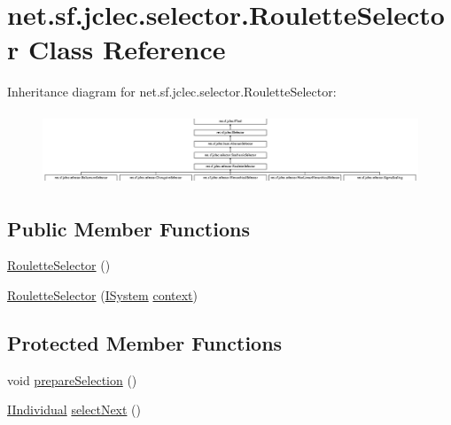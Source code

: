 \hypertarget{classnet_1_1sf_1_1jclec_1_1selector_1_1_roulette_selector}{\section{net.\-sf.\-jclec.\-selector.\-Roulette\-Selector Class Reference}
\label{classnet_1_1sf_1_1jclec_1_1selector_1_1_roulette_selector}
}
Inheritance diagram for net.\-sf.\-jclec.\-selector.\-Roulette\-Selector\-:\begin{figure}[H]
\begin{center}
\leavevmode
\includegraphics[height=2.160772cm]{classnet_1_1sf_1_1jclec_1_1selector_1_1_roulette_selector}
\end{center}
\end{figure}
\subsection*{Public Member Functions}
\begin{DoxyCompactItemize}
\item 
\hyperlink{classnet_1_1sf_1_1jclec_1_1selector_1_1_roulette_selector_afaec52b2dd1d7525b35d5976fd80e426}{Roulette\-Selector} ()
\item 
\hyperlink{classnet_1_1sf_1_1jclec_1_1selector_1_1_roulette_selector_a2daee135bd852331d23930344a51fb0c}{Roulette\-Selector} (\hyperlink{interfacenet_1_1sf_1_1jclec_1_1_i_system}{I\-System} \hyperlink{classnet_1_1sf_1_1jclec_1_1base_1_1_abstract_selector_a4304fe5c27aa7631dc91678d22473b94}{context})
\end{DoxyCompactItemize}
\subsection*{Protected Member Functions}
\begin{DoxyCompactItemize}
\item 
void \hyperlink{classnet_1_1sf_1_1jclec_1_1selector_1_1_roulette_selector_a1ce03c3e978aadacffd10309c36d82db}{prepare\-Selection} ()
\item 
\hyperlink{interfacenet_1_1sf_1_1jclec_1_1_i_individual}{I\-Individual} \hyperlink{classnet_1_1sf_1_1jclec_1_1selector_1_1_roulette_selector_a4403c44d775ee37fd7c8d69662106499}{select\-Next} ()
\end{DoxyCompactItemize}
